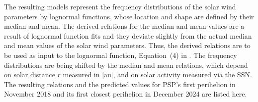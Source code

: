 The resulting models represent the frequency distributions of the solar wind parameters by lognormal functions, whose location and shape are defined by their median and mean.
The derived relations for the median and mean values are a result of lognormal function fits and they deviate slightly from the actual median and mean values of the solar wind parameters. Thus, the derived relations are to be used as input to the lognormal function, Equation~(4) in \citet{Venzmer2018}.
The frequency distributions are being shifted by the median and mean relations, which depend on solar distance $r$ measured in [au], and on solar activity measured via the SSN. The resulting relations and the predicted values for PSP's first perihelion in November 2018 and its first closest perihelion in December 2024 are listed here.
